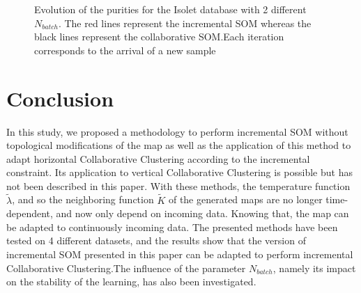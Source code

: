 \begin{figure}[!h]
					\caption{Evolution of the purities for the Isolet database with 2 different $N_{batch}$. The red lines represent the incremental SOM whereas the black lines represent the collaborative SOM.\@ Each iteration corresponds to the arrival of a new sample}
\label{fig:isom}
				\end{figure}

	\section{Conclusion}
\label{conclusion}
	In this study, we proposed a methodology to perform incremental SOM without topological modifications of the map as well as the application of this method to adapt horizontal Collaborative Clustering according to the incremental constraint. Its application to vertical Collaborative Clustering is possible but has not been described in this paper. With these methods, the temperature function $\widetilde{\lambda}$, and so the neighboring function $\widetilde{K}$ of the generated maps are no longer time-dependent, and now only depend on incoming data. Knowing that, the map can be adapted to continuously incoming data. The presented methods have been tested on 4 different datasets, and the results show that the version of incremental SOM presented in this paper can be adapted to perform incremental Collaborative Clustering.\@ The influence of the parameter $N_{batch}$, namely its impact on the stability of the learning, has also been investigated.
	
